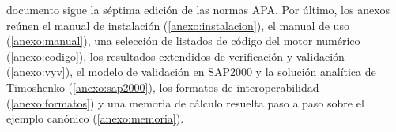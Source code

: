 documento sigue la séptima edición de las normas APA. Por último, los anexos reúnen el manual de instalación (\autoref{anexo:instalacion}), el manual de uso (\autoref{anexo:manual}), una selección de listados de código del motor numérico (\autoref{anexo:codigo}), los resultados extendidos de verificación y validación (\autoref{anexo:vyv}), el modelo de validación en SAP2000 y la solución analítica de Timoshenko (\autoref{anexo:sap2000}), los formatos de interoperabilidad (\autoref{anexo:formatos}) y una memoria de cálculo resuelta paso a paso sobre el ejemplo canónico (\autoref{anexo:memoria}).
